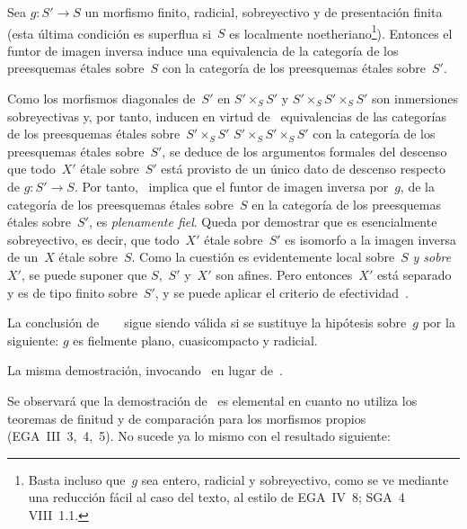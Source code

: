 \begin{theoreme}
\label{IX.4.10}
Sea $g\colon S'\to S$ un morfismo finito, radicial, sobreyectivo y de
presentación finita (esta última condición es superflua si~$S$ es
localmente noetheriano\footnote{Basta incluso que~$g$ sea entero, radicial
y sobreyectivo, como se ve mediante una reducción fácil al caso del texto,
al estilo de EGA~IV~8; \cf SGA~4 VIII~1.1.}).
Entonces el funtor de imagen inversa induce una equivalencia de la categoría
de los preesquemas étales sobre~$S$ con la categoría de los preesquemas
étales sobre~$S'$.
\end{theoreme}

Como los morfismos diagonales de~$S'$ en $S'\times_S S'$ y
$S'\times_S S'\times_S S'$ son inmersiones sobreyectivas y, por tanto,
inducen en virtud de~ equivalencias de las categorías de los
preesquemas étales sobre~$S'\times_S S'$ \resp
$S'\times_S S'\times_S S'$ con la categoría de los preesquemas étales
sobre~$S'$, se deduce de los argumentos formales del descenso~\cite{IX.D}
que todo~$X'$ étale sobre~$S'$ está provisto de un único dato de descenso
respecto de $g\colon S'\to S$. Por tanto,~ implica que el
funtor de imagen inversa por~$g$, de la categoría de los preesquemas étales
sobre~$S$ en la categoría de los preesquemas étales sobre~$S'$, es
\emph{plenamente fiel}. Queda por demostrar que es esencialmente
sobreyectivo, es decir, que todo~$X'$ étale sobre~$S'$ es isomorfo a la
imagen inversa de un~$X$ étale sobre~$S$. Como la cuestión es evidentemente
local sobre~$S$ \emph{y sobre}~$X'$, se puede suponer que $S$,~$S'$ y~$X'$
son afines. Pero entonces~$X'$ está separado y es de tipo finito
sobre~$S'$, y se puede aplicar el criterio de efectividad~.

\begin{corollaire}
\label{IX.4.11}
La conclusión de
{~}
{~}
sigue siendo válida si se sustituye la hipótesis sobre~$g$ por la
siguiente: $g$ es fielmente plano, cuasicompacto y radicial.
\end{corollaire}

La misma demostración, invocando~ en lugar
de~.

Se observará que la demostración de~ es
\og elemental\fg{} en cuanto no utiliza los teoremas
{}
{de}
finitud y de comparación para los morfismos propios (EGA~III~3,~4,~5).
No sucede ya lo mismo con el resultado siguiente:

